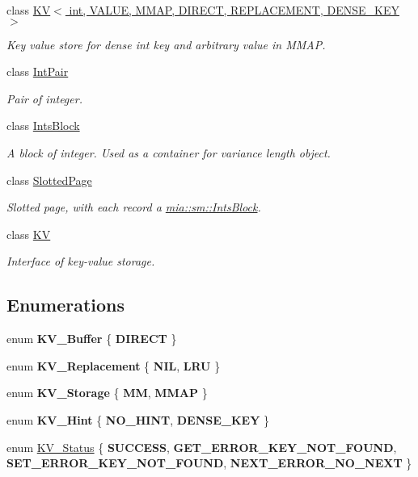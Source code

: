 \begin{DoxyCompactItemize}
class \hyperlink{classmia_1_1sm_1_1_k_v_3_01int_00_01_v_a_l_u_e_00_01_m_m_a_p_00_01_d_i_r_e_c_t_00_01_r_e_p_l_a_c808626285fb72e917596de806785defa}{K\-V$<$ int, V\-A\-L\-U\-E, M\-M\-A\-P, D\-I\-R\-E\-C\-T, R\-E\-P\-L\-A\-C\-E\-M\-E\-N\-T, D\-E\-N\-S\-E\-\_\-\-K\-E\-Y $>$}
\begin{DoxyCompactList}\small\item\em Key value store for dense int key and arbitrary value in M\-M\-A\-P. \end{DoxyCompactList}\item 
class \hyperlink{classmia_1_1sm_1_1_int_pair}{Int\-Pair}
\begin{DoxyCompactList}\small\item\em Pair of integer. \end{DoxyCompactList}\item 
class \hyperlink{classmia_1_1sm_1_1_ints_block}{Ints\-Block}
\begin{DoxyCompactList}\small\item\em A block of integer. Used as a container for variance length object. \end{DoxyCompactList}\item 
class \hyperlink{classmia_1_1sm_1_1_slotted_page}{Slotted\-Page}
\begin{DoxyCompactList}\small\item\em Slotted page, with each record a \hyperlink{classmia_1_1sm_1_1_ints_block}{mia\-::sm\-::\-Ints\-Block}. \end{DoxyCompactList}\item 
class \hyperlink{classmia_1_1sm_1_1_k_v}{K\-V}
\begin{DoxyCompactList}\small\item\em Interface of key-\/value storage. \end{DoxyCompactList}\end{DoxyCompactItemize}
\subsection*{Enumerations}
\begin{DoxyCompactItemize}
\item 
enum {\bfseries K\-V\-\_\-\-Buffer} \{ {\bfseries D\-I\-R\-E\-C\-T}
 \}
\item 
enum {\bfseries K\-V\-\_\-\-Replacement} \{ {\bfseries N\-I\-L}, 
{\bfseries L\-R\-U}
 \}
\item 
enum {\bfseries K\-V\-\_\-\-Storage} \{ {\bfseries M\-M}, 
{\bfseries M\-M\-A\-P}
 \}
\item 
enum {\bfseries K\-V\-\_\-\-Hint} \{ {\bfseries N\-O\-\_\-\-H\-I\-N\-T}, 
{\bfseries D\-E\-N\-S\-E\-\_\-\-K\-E\-Y}
 \}
\item 
enum \hyperlink{namespacemia_1_1sm_a401cbf14ccf01146eb01e3a19aa5a0dc}{K\-V\-\_\-\-Status} \{ {\bfseries S\-U\-C\-C\-E\-S\-S}, 
{\bfseries G\-E\-T\-\_\-\-E\-R\-R\-O\-R\-\_\-\-K\-E\-Y\-\_\-\-N\-O\-T\-\_\-\-F\-O\-U\-N\-D}, 
{\bfseries S\-E\-T\-\_\-\-E\-R\-R\-O\-R\-\_\-\-K\-E\-Y\-\_\-\-N\-O\-T\-\_\-\-F\-O\-U\-N\-D}, 
{\bfseries N\-E\-X\-T\-\_\-\-E\-R\-R\-O\-R\-\_\-\-N\-O\-\_\-\-N\-E\-X\-T}
 \}
\end{DoxyCompactItemize}


